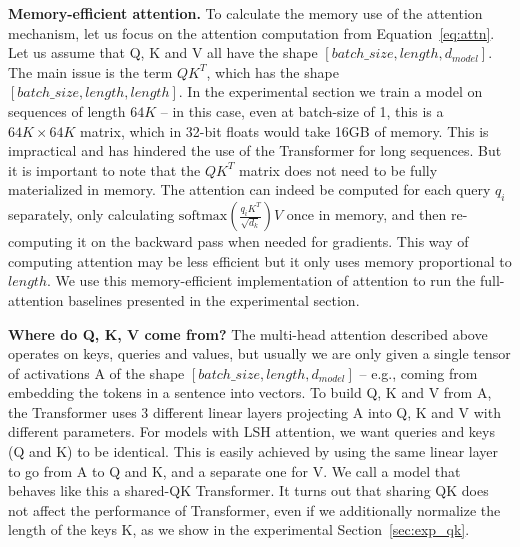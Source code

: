 \documentclass{article} %
\renewcommand{\paragraph}[1]{\textbf{#1}}
\begin{document}
\paragraph{Memory-efficient attention.}
To calculate the memory use of the attention mechanism, let us focus on
the attention computation from Equation~\ref{eq:attn}.
Let us assume that Q, K and V all have the shape
$[batch\_size, length, d_{model}]$. The main issue is
the term $QK^T$, which has the shape $[batch\_size, length, length]$.
In the experimental section we train a model on sequences of length
$64K$ -- in this case, even at batch-size of 1, this is a $64K \times 64K$
matrix, which in 32-bit floats would take 16GB of memory.
This is impractical and has hindered the use of the Transformer for long
sequences. But it is important to note that the $QK^T$ matrix does not
need to be fully materialized in memory. The attention can indeed be computed
for each query $q_i$ separately, only calculating $\mathrm{softmax}(\frac{q_iK^T}{\sqrt{d_k}})V$ 
once in memory, and then re-computing it on the backward pass when needed for gradients.
This way of computing attention may be less efficient but it only uses
memory proportional to $length$. We use this memory-efficient implementation
of attention to run the full-attention baselines presented in the experimental
section.

\paragraph{Where do Q, K, V come from?}
The multi-head attention described above operates on keys, queries and
values, but usually we are only given a single tensor of activations A
of the shape $[batch\_size, length, d_{model}]$ -- e.g., coming from
embedding the tokens in a sentence into vectors. To build Q, K and V
from A, the Transformer uses 3 different linear layers projecting A
into Q, K and V with different parameters. For models with LSH attention,
we want queries and keys (Q and K) to be identical. This is easily achieved
by using the same linear layer to go from A to Q and K, and a separate one
for V. We call a model that behaves like this a shared-QK Transformer.
It turns out that sharing QK does not affect the performance of Transformer,
even if we additionally normalize the length of the keys K,
as we show in the experimental Section~\ref{sec:exp_qk}.
\end{document}
